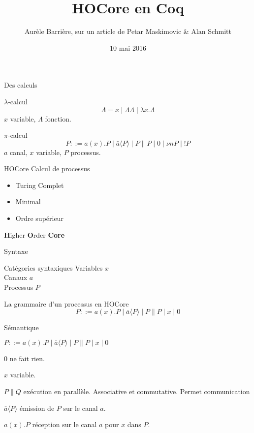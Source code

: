 \documentclass{beamer}
\title{HOCore en Coq}
\date{10 mai 2016}
\author[Aurèle Barrière]{Aurèle Barrière, sur un article de Petar Maskimovic \& Alan Schmitt}
\begin{document}
\begin{frame}
\maketitle
\end{frame}

\begin{frame}{Des calculs}
\begin{block}{$\lambda$-calcul}
$$\Lambda = x \mid \Lambda\Lambda \mid \lambda x.\Lambda$$
$x$ variable, $\Lambda$ fonction.
\end{block}
\begin{block}{$\pi$-calcul}
$$ P ::= a(x).P \mid \bar{a}\langle P\rangle \mid P\|P \mid 0 \mid \nu n P\mid !P $$
$a$ canal, $x$ variable, $P$ processus.
\end{block}
\end{frame}


\begin{frame}{HOCore}
Calcul de processus

\begin{itemize}
\item Turing Complet
\item Minimal
\item Ordre supérieur
\end{itemize}

\textbf{H}igher \textbf{O}rder \textbf{Core}
\end{frame}

\begin{frame}{Syntaxe}
\begin{block}{Catégories syntaxiques}
Variables $x$\\
Canaux $a$\\
Processus $P$
\end{block}

La grammaire d'un processus en HOCore
$$ P ::= a(x).P \mid \bar{a}\langle P\rangle \mid P\|P \mid x \mid 0 $$

\end{frame}

\begin{frame}{Sémantique}

\begin{alertblock}{}
$ P ::= a(x).P \mid \bar{a}\langle P\rangle \mid P\|P \mid x \mid 0 $
\end{alertblock}


$0$ ne fait rien.

$x$ variable.

$P\|Q$ exécution en parallèle. Associative et commutative. Permet communication

$\bar{a}\langle P\rangle$ émission de $P$ sur le canal $a$.

$a(x).P$ réception sur le canal $a$ pour $x$ dans $P$.

\end{frame}
\end{document}
